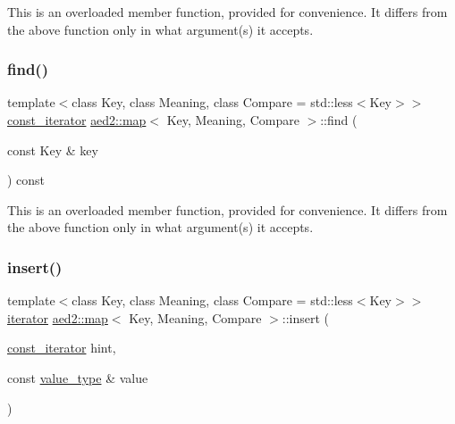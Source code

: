 This is an overloaded member function, provided for convenience. It differs from the above function only in what argument(s) it accepts. \mbox{\label{classaed2_1_1map_adbf6f4ce01a16ca506e3c75fc2843882}} 
\subsubsection{\texorpdfstring{find()}{find()}\hspace{0.1cm}{\footnotesize\ttfamily [4/4]}}
{\footnotesize\ttfamily template$<$class Key, class Meaning, class Compare = std\+::less$<$\+Key$>$$>$ \\
\hyperlink{classaed2_1_1map_1_1const__iterator}{const\+\_\+iterator} \hyperlink{classaed2_1_1map}{aed2\+::map}$<$ Key, Meaning, Compare $>$\+::find (\begin{DoxyParamCaption}\item[{const Key \&}]{key }\end{DoxyParamCaption}) const\hspace{0.3cm}{\ttfamily [inline]}}

This is an overloaded member function, provided for convenience. It differs from the above function only in what argument(s) it accepts. \mbox{\label{classaed2_1_1map_a6941cde9a79c27f054b5c97a587a1854}} 
\subsubsection{\texorpdfstring{insert()}{insert()}\hspace{0.1cm}{\footnotesize\ttfamily [1/4]}}
{\footnotesize\ttfamily template$<$class Key, class Meaning, class Compare = std\+::less$<$\+Key$>$$>$ \\
\hyperlink{classaed2_1_1map_1_1iterator}{iterator} \hyperlink{classaed2_1_1map}{aed2\+::map}$<$ Key, Meaning, Compare $>$\+::insert (\begin{DoxyParamCaption}\item[{\hyperlink{classaed2_1_1map_1_1const__iterator}{const\+\_\+iterator}}]{hint,  }\item[{const \hyperlink{classaed2_1_1map_a719db98e0ff9a837610f76be33264680}{value\+\_\+type} \&}]{value }\end{DoxyParamCaption})\hspace{0.3cm}{\ttfamily [inline]}}



